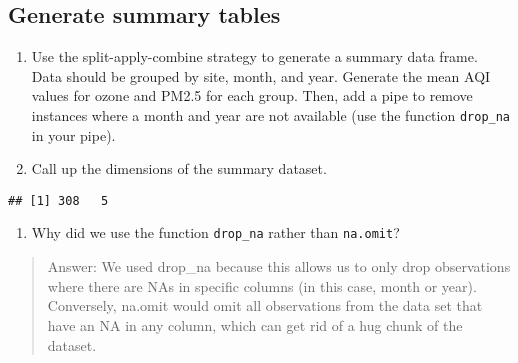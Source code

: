 \documentclass[]{article}
\newenvironment{Shaded}{\begin{snugshade}}{\end{snugshade}}
\newcommand{\CommentTok}[1]{\textcolor[rgb]{0.56,0.35,0.01}{\textit{#1}}}
\newcommand{\DataTypeTok}[1]{\textcolor[rgb]{0.13,0.29,0.53}{#1}}
\newcommand{\FloatTok}[1]{\textcolor[rgb]{0.00,0.00,0.81}{#1}}
\newcommand{\KeywordTok}[1]{\textcolor[rgb]{0.13,0.29,0.53}{\textbf{#1}}}
\newcommand{\NormalTok}[1]{#1}
\newcommand{\OperatorTok}[1]{\textcolor[rgb]{0.81,0.36,0.00}{\textbf{#1}}}
\newcommand{\StringTok}[1]{\textcolor[rgb]{0.31,0.60,0.02}{#1}}
\providecommand{\tightlist}{%
  \setlength{\itemsep}{0pt}\setlength{\parskip}{0pt}}
\begin{document}
\hypertarget{generate-summary-tables}{%
\subsection{Generate summary tables}\label{generate-summary-tables}}

\begin{enumerate}
\def\labelenumi{\arabic{enumi}.}
\setcounter{enumi}{11}
\item
  Use the split-apply-combine strategy to generate a summary data frame.
  Data should be grouped by site, month, and year. Generate the mean AQI
  values for ozone and PM2.5 for each group. Then, add a pipe to remove
  instances where a month and year are not available (use the function
  \texttt{drop\_na} in your pipe).
\item
  Call up the dimensions of the summary dataset.
\end{enumerate}

\begin{Shaded}
\end{Shaded}

\begin{verbatim}
## [1] 308   5
\end{verbatim}

\begin{enumerate}
\def\labelenumi{\arabic{enumi}.}
\setcounter{enumi}{13}
\tightlist
\item
  Why did we use the function \texttt{drop\_na} rather than
  \texttt{na.omit}?
\end{enumerate}

\begin{quote}
Answer: We used drop\_na because this allows us to only drop
observations where there are NAs in specific columns (in this case,
month or year). Conversely, na.omit would omit all observations from the
data set that have an NA in any column, which can get rid of a hug chunk
of the dataset.
\end{quote}
\end{document}
